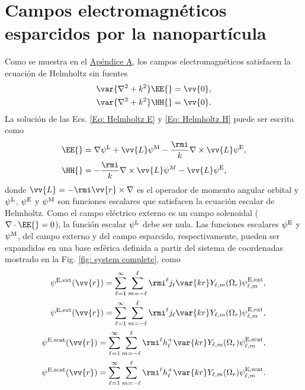 \section{Campos electromagnéticos esparcidos por la nanopartícula}
Como se muestra en el \hyperref[AppendixScalarPotentials]{Apéndice A}, los campos electromagnéticos satisfacen la ecuación de Helmholtz sin fuentes
\begin{align}
\var{\nabla^2+k^2}\EE{} = \vv{0},\label{Eq: Helmholtz E}\\
\var{\nabla^2+k^2}\HH{} = \vv{0}.\label{Eq: Helmholtz H}
\end{align}
La solución de las Ecs. \eqref{Eq: Helmholtz E} y \eqref{Eq: Helmholtz H} puede ser escrita como \cite{Low}
\begin{align}
\EE{} &= \nabla\psi^{\rm L} + \vv{L}\psi^{\rm M}-\frac{\rmi}{k}\nabla\times\vv{L}\psi^{\rm E}, \label{Eq: E field in terms of potentials}\\
\HH{} &= -\frac{\rmi}{k}\nabla\times\vv{L}\psi^{M}-\vv{L}\psi^{\rm E}, \label{Eq: H field in terms of potentials}
\end{align}
donde $\vv{L}=-\rmi \vv{r}\times\nabla$ es el operador de momento angular orbital y $\psi^{\rm L}$, $\psi^{\rm E}$ y $\psi^{\rm M}$ son  funciones escalares que satisfacen la ecuación escalar de Helmholtz. Como el campo eléctrico externo es un campo solenoidal ($\nabla\cdot\EE{}=0$), la función escalar $\psi^{\rm L}$ debe ser nula. Las funciones escalares $\psi^{\rm E}$ y $\psi^{\rm M}$, del campo externo y del campo esparcido, respectivamente, pueden ser expandidas en una base esférica definida a partir del sistema de coordenadas mostrado en la Fig. \ref{fig: system complete}, como \cite{de1999relativistic}
\begin{align}
\psi^{\rm E, \text{ext}}(\vv{r})=\sum_{\ell =1}^{\infty}\sum_{m=-\ell}^{\ell}\rmi^{\ell}j_{\ell}\var{kr}Y_{\ell, m}(\Omega_r)\psi_{\ell, m}^{\rm E, \text{ext}},\\
\psi^{\rm E, \text{ext}}(\vv{r})=\sum_{\ell =1}^{\infty}\sum_{m=-\ell}^{\ell}\rmi^{\ell}j_{\ell}\var{kr}Y_{\ell, m}(\Omega_r)\psi_{\ell, m}^{\rm E, \text{ext}},\\
\psi^{\rm E, \text{scat}}(\vv{r})=\sum_{\ell =1}^{\infty}\sum_{m=-\ell}^{\ell}\rmi^{\ell}h_{\ell}^{+}\var{kr}Y_{\ell, m}(\Omega_r)\psi_{\ell, m}^{\rm E, \text{scat}},\\
\psi^{\rm E, \text{scat}}(\vv{r})=\sum_{\ell =1}^{\infty}\sum_{m=-\ell}^{\ell}\rmi^{\ell}h_{\ell}^{+}\var{kr}Y_{\ell, m}(\Omega_r)\psi_{\ell, m}^{\rm E, \text{scat}}.
\end{align}
